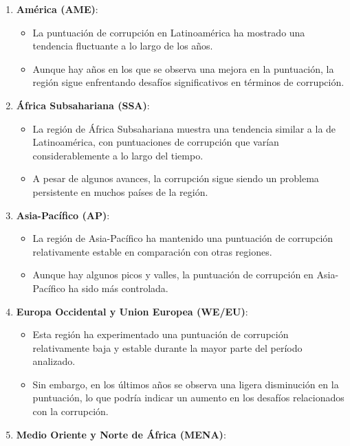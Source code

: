 \documentclass[
]{article}
\providecommand{\tightlist}{%
  \setlength{\itemsep}{0pt}\setlength{\parskip}{0pt}}
\begin{document}
\begin{enumerate}
\def\labelenumi{\arabic{enumi}.}
\tightlist
\item
  \textbf{América (AME)}:

  \begin{itemize}
  \tightlist
  \item
    La puntuación de corrupción en Latinoamérica ha mostrado una
    tendencia fluctuante a lo largo de los años.
  \item
    Aunque hay años en los que se observa una mejora en la puntuación,
    la región sigue enfrentando desafíos significativos en términos de
    corrupción.
  \end{itemize}
\item
  \textbf{África Subsahariana (SSA)}:

  \begin{itemize}
  \tightlist
  \item
    La región de África Subsahariana muestra una tendencia similar a la
    de Latinoamérica, con puntuaciones de corrupción que varían
    considerablemente a lo largo del tiempo.
  \item
    A pesar de algunos avances, la corrupción sigue siendo un problema
    persistente en muchos países de la región.
  \end{itemize}
\item
  \textbf{Asia-Pacífico (AP)}:

  \begin{itemize}
  \tightlist
  \item
    La región de Asia-Pacífico ha mantenido una puntuación de corrupción
    relativamente estable en comparación con otras regiones.
  \item
    Aunque hay algunos picos y valles, la puntuación de corrupción en
    Asia-Pacífico ha sido más controlada.
  \end{itemize}
\item
  \textbf{Europa Occidental y Union Europea (WE/EU)}:

  \begin{itemize}
  \tightlist
  \item
    Esta región ha experimentado una puntuación de corrupción
    relativamente baja y estable durante la mayor parte del período
    analizado.
  \item
    Sin embargo, en los últimos años se observa una ligera disminución
    en la puntuación, lo que podría indicar un aumento en los desafíos
    relacionados con la corrupción.
  \end{itemize}
\item
  \textbf{Medio Oriente y Norte de África (MENA)}:


\end{enumerate}
\end{document}
